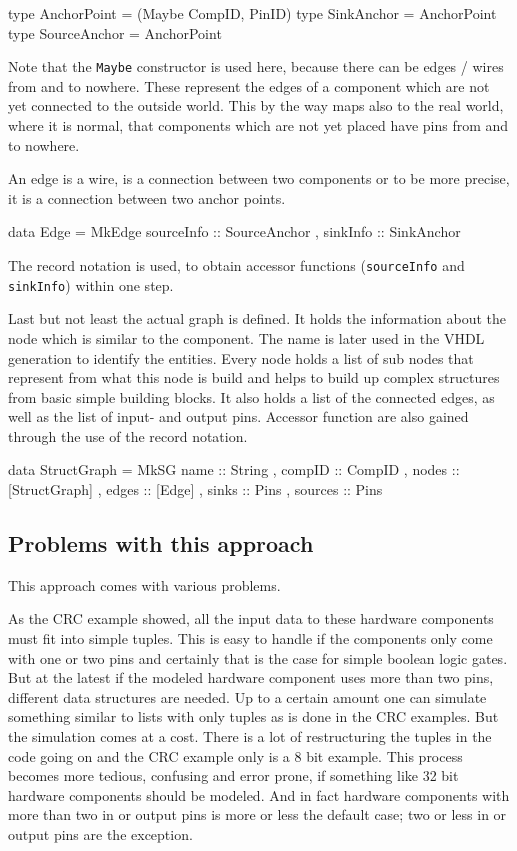 \documentclass[9pt,final,a4paper,leqno]{article}
\newcommand{\hs}[1]{\mbox{\lstinline[basicstyle=\color{textgray}]!#1!}}
\begin{document}
\begin{haskell}
type AnchorPoint  = (Maybe CompID, PinID)
type SinkAnchor   = AnchorPoint
type SourceAnchor = AnchorPoint
\end{haskell}

Note that the \hs{Maybe} constructor is used here, because there can be edges / wires from and to nowhere. These represent the edges of a
component which are not yet connected to the outside world. This by the way maps also to the real world, where it is normal, that
components which are not yet placed have pins from and to nowhere. 

\par
An edge is a wire, is a connection between two components or to be more precise, it is a connection between two anchor points. 
\begin{haskell}
data Edge 
  = MkEdge { sourceInfo :: SourceAnchor
           , sinkInfo   :: SinkAnchor }
\end{haskell}
The record notation is used, to obtain accessor functions (\hs{sourceInfo} and \hs{sinkInfo}) within one step. 

\par 
Last but not least the actual graph is defined. It holds the information about the node which is similar to the component. The name is later
used in the VHDL generation to identify the entities. Every node holds a list of sub nodes that represent from what this node is build and
helps to build up complex structures from basic simple building blocks. It also holds a list of the connected edges, as well as the list of
input- and output pins. Accessor function are also gained through the use of the record notation.
\begin{haskell}
data StructGraph
  = MkSG { name    :: String
         , compID  :: CompID
         , nodes   :: [StructGraph]
         , edges   :: [Edge]
         , sinks   :: Pins
         , sources :: Pins }   
\end{haskell}

\subsection{Problems with this approach}
This approach comes with various problems. 

As the CRC example showed, all the input data to these hardware components must fit into simple tuples. This is easy to handle if the
components only come with one or two pins and certainly that is the case for simple boolean logic gates. But at the latest if the modeled
hardware component uses more than two pins, different data structures are needed. Up to a certain amount one can simulate something similar
to lists with only tuples as is done in the CRC examples. But the simulation comes at a cost. There is a lot of restructuring the tuples in
the code going on and the CRC example only is a $8$ bit example. This process becomes more tedious, confusing and error prone, if something
like 32 bit hardware components should be modeled. And in fact hardware components with more than two in or output pins is more or less the
default case; two or less in or output pins are the exception.
\end{document}
